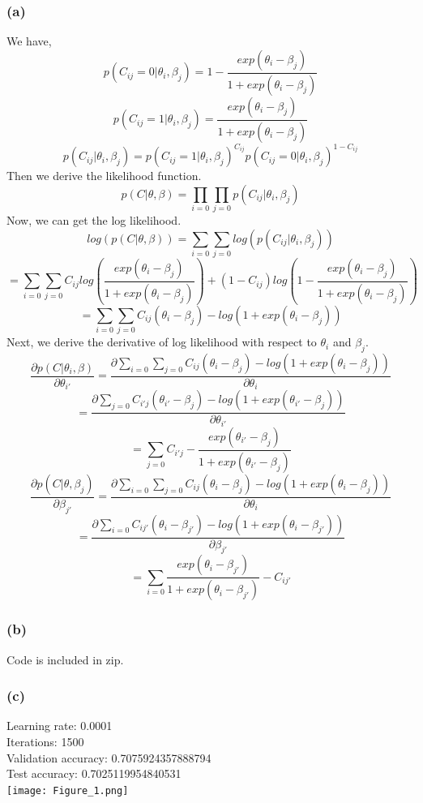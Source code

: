 \documentclass{article}
\begin{document}
\subsubsection{(a)}
We have,
$$
p(C_{ij} = 0|\theta_i, \beta_j) = 1 - \frac{exp(\theta_i - \beta_j)}{ 1 + exp(\theta_i - \beta_j)} 
$$
$$
p(C_{ij} = 1|\theta_i, \beta_j) = \frac{exp(\theta_i - \beta_j)}{ 1 + exp(\theta_i - \beta_j)} 
$$
$$
p(C_{ij}|\theta_i, \beta_j) = p(C_{ij} = 1|\theta_i, \beta_j)^{C_{ij}} p(C_{ij} = 0|\theta_i, \beta_j)^{1-C_{ij}}
$$
Then we derive the likelihood function.
$$
p(C|\theta, \beta) = \prod_{i = 0} \prod_{j = 0} p(C_{ij}|\theta_i, \beta_j)
$$
Now, we can get the log likelihood.
$$
log(p(C|\theta, \beta)) = \sum_{i = 0} \sum_{j = 0} log(p(C_{ij}|\theta_i, \beta_j))
$$
$$
= \sum_{i = 0} \sum_{j = 0} C_{ij}log(\frac{exp(\theta_i - \beta_j)}{ 1 + exp(\theta_i - \beta_j)}) + (1 - C_{ij})log(1-\frac{exp(\theta_i - \beta_j)}{ 1 + exp(\theta_i - \beta_j)})
$$
$$
= \sum_{i = 0} \sum_{j = 0} C_{ij}(\theta_i - \beta_j) - log(1+exp(\theta_i - \beta_j))
$$
Next, we derive the derivative of log likelihood with respect to $\theta_i$ and $\beta_j$.
$$
\frac{\partial p(C|\theta_i, \beta)}{\partial \theta_{i'}} = \frac{\partial \sum_{i = 0} \sum_{j = 0} C_{ij}(\theta_{i} - \beta_j) - log(1+exp(\theta_{i} - \beta_j))}{\partial \theta_{i}}
$$
$$
= \frac{\partial \sum_{j = 0} C_{i'j}(\theta_{i'} - \beta_j) - log(1+exp(\theta_{i'} - \beta_j))}{\partial \theta_{i'}}
$$
$$
= \sum_{j = 0}  C_{i'j} - \frac{exp(\theta_{i'} - \beta_j)}{ 1 + exp(\theta_{i'} - \beta_j)} 
$$
$$
\frac{\partial p(C|\theta, \beta_j)}{\partial \beta_{j'}} = \frac{\partial \sum_{i = 0} \sum_{j = 0} C_{ij}(\theta_{i} - \beta_j) - log(1+exp(\theta_{i} - \beta_j))}{\partial \theta_{i}}
$$
$$
= \frac{\partial \sum_{i = 0} C_{ij'}(\theta_i - \beta_{j'}) - log(1+exp(\theta_i - \beta_{j'}))}{\partial \beta_{j'}}
$$
$$
= \sum_{i = 0} \frac{exp(\theta_i - \beta_{j'})}{ 1 + exp(\theta_i - \beta_{j'})}- C_{ij'} 
$$
\subsubsection{(b)}
Code is included in zip.

\newpage
\subsubsection{(c)}
Learning rate: 0.0001\\
Iterations: 1500\\
Validation accuracy: 0.7075924357888794\\
Test accuracy: 0.7025119954840531\\
\texttt{[image: Figure\_1.png]}\\
\end{document}
